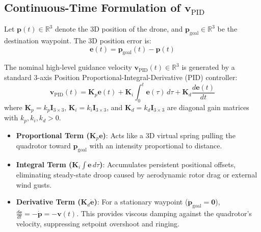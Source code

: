\documentclass[11pt,a4paper]{article}
\begin{document}
\subsection{Continuous-Time Formulation of \texorpdfstring{$\mathbf{v}_{\mathrm{PID}}$}{v\_PID}}
Let $\mathbf{p}(t) \in \mathbb{R}^3$ denote the 3D position of the drone, and $\mathbf{p}_{\mathrm{goal}} \in \mathbb{R}^3$ be the destination waypoint. The 3D position error is:
\begin{equation}
\mathbf{e}(t) = \mathbf{p}_{\mathrm{goal}}(t) - \mathbf{p}(t)
\label{eq:pos_error}
\end{equation}

The nominal high-level guidance velocity $\mathbf{v}_{\mathrm{PID}}(t) \in \mathbb{R}^3$ is generated by a standard 3-axis Position Proportional-Integral-Derivative (PID) controller:
\begin{equation}
\mathbf{v}_{\mathrm{PID}}(t) = \mathbf{K}_p \mathbf{e}(t) + \mathbf{K}_i \int_{0}^{t} \mathbf{e}(\tau) \, d\tau + \mathbf{K}_d \frac{d\mathbf{e}(t)}{dt}
\label{eq:pid_continuous}
\end{equation}
where $\mathbf{K}_p = k_p \mathbf{I}_{3 \times 3}$, $\mathbf{K}_i = k_i \mathbf{I}_{3 \times 3}$, and $\mathbf{K}_d = k_d \mathbf{I}_{3 \times 3}$ are diagonal gain matrices with $k_p, k_i, k_d > 0$.

\begin{intuitionbox}
\begin{itemize}
    \item \textbf{Proportional Term ($\mathbf{K}_p \mathbf{e}$)}: Acts like a 3D virtual spring pulling the quadrotor toward $\mathbf{p}_{\mathrm{goal}}$ with an intensity proportional to distance.
    \item \textbf{Integral Term ($\mathbf{K}_i \int \mathbf{e} \, d\tau$)}: Accumulates persistent positional offsets, eliminating steady-state droop caused by aerodynamic rotor drag or external wind gusts.
    \item \textbf{Derivative Term ($\mathbf{K}_d \dot{\mathbf{e}}$)}: For a stationary waypoint ($\mathbf{\dot{p}}_{\mathrm{goal}} = \mathbf{0}$), $\frac{d\mathbf{e}}{dt} = -\mathbf{\dot{p}} = -\mathbf{v}(t)$. This provides viscous damping against the quadrotor's velocity, suppressing setpoint overshoot and ringing.
\end{itemize}
\end{intuitionbox}
\end{document}
